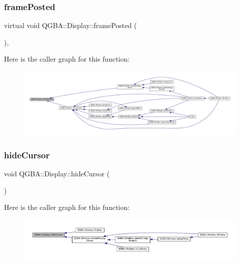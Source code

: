 \subsubsection{\texorpdfstring{frame\+Posted}{framePosted}}
{\footnotesize\ttfamily virtual void Q\+G\+B\+A\+::\+Display\+::frame\+Posted (\begin{DoxyParamCaption}{ }\end{DoxyParamCaption})\hspace{0.3cm}{\ttfamily [pure virtual]}, {\ttfamily [slot]}}

Here is the caller graph for this function\+:
\nopagebreak
\begin{figure}[H]
\begin{center}
\leavevmode
\includegraphics[width=350pt]{class_q_g_b_a_1_1_display_ac60ec1f613bd782165ba3bdbe14d9439_icgraph}
\end{center}
\end{figure}
\mbox{\label{class_q_g_b_a_1_1_display_ae2ba6f816b6ed52108871e29b808b5b9}} 
\subsubsection{\texorpdfstring{hide\+Cursor}{hideCursor}}
{\footnotesize\ttfamily void Q\+G\+B\+A\+::\+Display\+::hide\+Cursor (\begin{DoxyParamCaption}{ }\end{DoxyParamCaption})\hspace{0.3cm}{\ttfamily [signal]}}

Here is the caller graph for this function\+:
\nopagebreak
\begin{figure}[H]
\begin{center}
\leavevmode
\includegraphics[width=350pt]{class_q_g_b_a_1_1_display_ae2ba6f816b6ed52108871e29b808b5b9_icgraph}
\end{center}
\end{figure}
\mbox{\label{class_q_g_b_a_1_1_display_a3faa159946cd55ef4696cd2e7585ac42}} 
